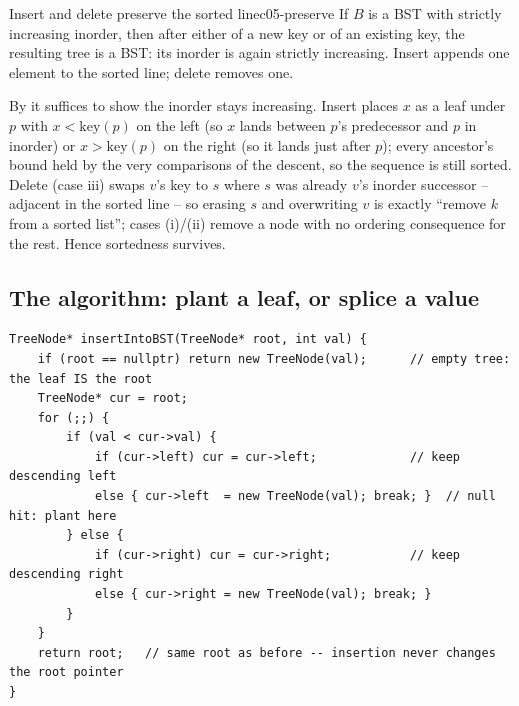 \begin{proposition}{Insert and delete preserve the sorted line}{c05-preserve}
If $B$ is a BST with strictly increasing inorder, then after either  of a new key
or  of an existing key, the resulting tree is a BST: its inorder is again
strictly increasing. Insert appends one element to the sorted line; delete removes one.
\end{proposition}
\begin{proofbox}
By  it suffices to show the inorder stays increasing. Insert places $x$ as a leaf
under $p$ with $x<\text{key}(p)$ on the left (so $x$ lands between $p$'s predecessor and $p$ in
inorder) or $x>\text{key}(p)$ on the right (so it lands just after $p$); every ancestor's bound held
by the very comparisons of the descent, so the sequence is still sorted. Delete (case iii) swaps
$v$'s key to $s$ where $s$ was already $v$'s inorder successor -- adjacent in the sorted line -- so
erasing $s$ and overwriting $v$ is exactly ``remove $k$ from a sorted list''; cases (i)/(ii) remove a
node with no ordering consequence for the rest. Hence sortedness survives. \end{proofbox}

\subsection{The algorithm: plant a leaf, or splice a value}

\begin{lstlisting}[caption={Insert a key into a BST -- a search that stops and plants (LeetCode 701)}, label={lst:c05-inscode}]
TreeNode* insertIntoBST(TreeNode* root, int val) {
    if (root == nullptr) return new TreeNode(val);      // empty tree: the leaf IS the root
    TreeNode* cur = root;
    for (;;) {
        if (val < cur->val) {
            if (cur->left) cur = cur->left;             // keep descending left
            else { cur->left  = new TreeNode(val); break; }  // null hit: plant here
        } else {
            if (cur->right) cur = cur->right;           // keep descending right
            else { cur->right = new TreeNode(val); break; }
        }
    }
    return root;   // same root as before -- insertion never changes the root pointer
}
\end{lstlisting}


